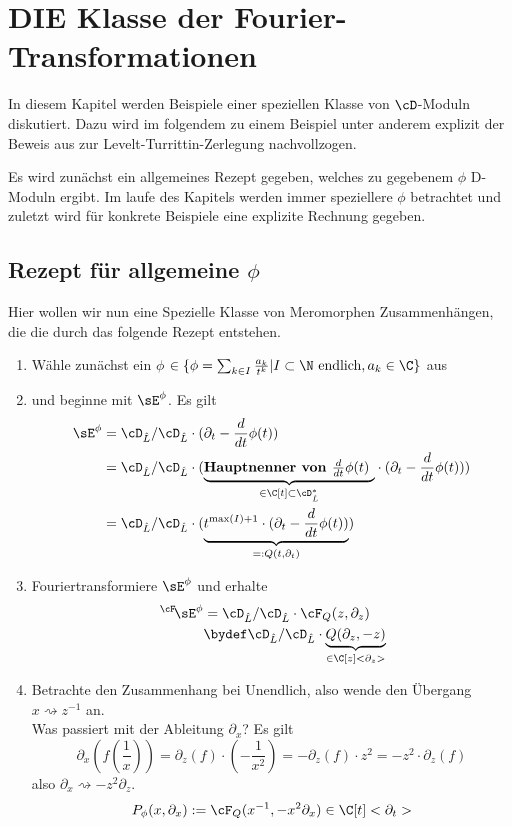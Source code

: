 \chapter{DIE Klasse der Fourier-Transformationen}
In diesem Kapitel werden Beispiele einer speziellen Klasse von $\cD$-Moduln
diskutiert. Dazu wird im folgendem zu einem Beispiel unter anderem explizit der
Beweis aus \cite{sabbah_cimpa90} zur Levelt-Turrittin-Zerlegung nachvollzogen.

Es wird zunächst ein allgemeines Rezept gegeben, welches zu gegebenem $\phi$
D-Moduln ergibt. Im laufe des Kapitels werden immer speziellere $\phi$
betrachtet und zuletzt wird für konkrete Beispiele eine explizite Rechnung
gegeben.

\section{Rezept für allgemeine $\phi$} \label{sec:allgemeinProblem}
Hier wollen wir nun eine Spezielle Klasse von Meromorphen Zusammenhängen, die
die durch das folgende Rezept entstehen.
\begin{enumerate}
\item Wähle zunächst ein $\phi$
$\in\{\phi=\sum_{k\in I}\frac{a_k}{t^{k}}|I\subset\N\mbox{ endlich}
,a_k\in \C\}$
aus
\item und beginne mit $\sE^{\phi}$. Es gilt
\begin{align*}
\sE^{\phi} &= \cD_{\hat L}/\cD_{\hat L}\cdot (\partial_t-\frac{d}{dt}\phi(t))
\\&=\cD_{\hat L}/\cD_{\hat L}\cdot (\underset{\in\C[t]\subset\cD_{\hat L}^*}
    {\underbrace{\mbox{\textbf{Hauptnenner von $\frac{d}{dt}\phi(t)$ }}}}
  \cdot (\partial_t-\frac{d}{dt}\phi(t)))
\\&=\cD_{\hat L}/\cD_{\hat L}\cdot ( \underset{=:Q(t,\partial_t)}{\underbrace{
  t^{\max(I)+1} \cdot (\partial_t-\frac{d}{dt}\phi(t))}})
\end{align*}
\begin{comment}
Dies ändert den Meromorphen Zusammenhang nicht, weil $t^{\max(I)+1}$ eine
Einheit in $\cD_{\hat L}$ (und auch in $\cD_{L}$) ist.
\end{comment}
\item Fouriertransformiere $\sE^{\phi}$ und erhalte
\begin{align*}
\,^\cF\!\sE^{\phi}&=\cD_{\hat L}/\cD_{\hat L}\cdot{\cF_Q(z,\partial_z)}
\\&\bydef \cD_{\hat L}/\cD_{\hat L}\cdot
  \underset{\in\C[z]<\partial_z>}{\underbrace{Q(\partial_z,-z)}}
\end{align*}
\item Betrachte den Zusammenhang bei Unendlich, also wende den Übergang
$x\rightsquigarrow z^{-1}$ an.\\
Was passiert mit der Ableitung $\partial_x$?
Es gilt
\[
\partial_x (f(\frac{1}{x}))=
\partial_z(f)\cdot (-\frac{1}{x^2})=
-\partial_z(f)\cdot z^2= %
- z^2 \cdot \partial_z(f)
\]
also $ \partial_x\rightsquigarrow-z^2\partial_z $.
\[
P_\phi(x,\partial_x):=\cF_Q(x^{-1},-x^2\partial_x) \in \C[t]<\partial_t>
\]
\end{enumerate}
